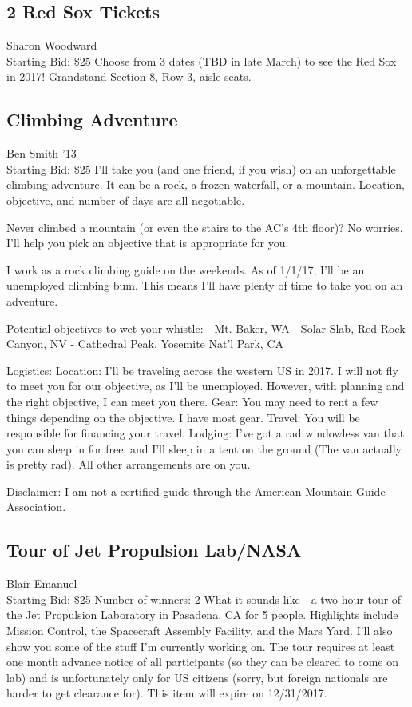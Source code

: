 \documentclass[11pt]{article}
\begin{document}
\subsection{2 Red Sox Tickets }
Sharon Woodward
\\
Starting Bid: \$25
\newline
Choose from 3 dates (TBD in late March) to see the Red Sox in 2017!  Grandstand Section 8, Row 3, aisle seats.
\subsection{Climbing Adventure}
Ben Smith '13
\\
Starting Bid: \$25
\newline
I'll take you (and one friend, if you wish) on an unforgettable climbing adventure. It can be a rock, a frozen waterfall, or a mountain. Location, objective, and number of days are all negotiable. 

Never climbed a mountain (or even the stairs to the AC's 4th floor)? No worries. I'll help you pick an objective that is appropriate for you.

I work as a rock climbing guide on the weekends. As of 1/1/17, I'll be an unemployed climbing bum. This means I'll have plenty of time to take you on an adventure.

Potential objectives to wet your whistle:
- Mt. Baker, WA
- Solar Slab, Red Rock Canyon, NV
- Cathedral Peak, Yosemite Nat'l Park, CA

Logistics:
Location: I'll be traveling across the western US in 2017. I will not fly to meet you for our objective, as I'll be unemployed. However, with planning and the right objective, I can meet you there.
Gear: You may need to rent a few things depending on the objective. I have most gear.
Travel: You will be responsible for financing your travel.
Lodging: I've got a rad windowless van that you can sleep in for free, and I'll sleep in a tent on the ground (The van actually is pretty rad). All other arrangements are on you.

Disclaimer: I am not a certified guide through the American Mountain Guide Association.
\subsection{Tour of Jet Propulsion Lab/NASA}
Blair Emanuel
\\
Starting Bid: \$25
\newline
Number of winners: 2
\newline
What it sounds like - a two-hour tour of the Jet Propulsion Laboratory in Pasadena, CA for 5 people. Highlights include Mission Control, the Spacecraft Assembly Facility, and the Mars Yard. I'll also show you some of the stuff I'm currently working on. The tour requires at least one month advance notice of all participants (so they can be cleared to come on lab) and is unfortunately only for US citizens (sorry, but foreign nationals are harder to get clearance for). This item will expire on 12/31/2017.
\end{document}
